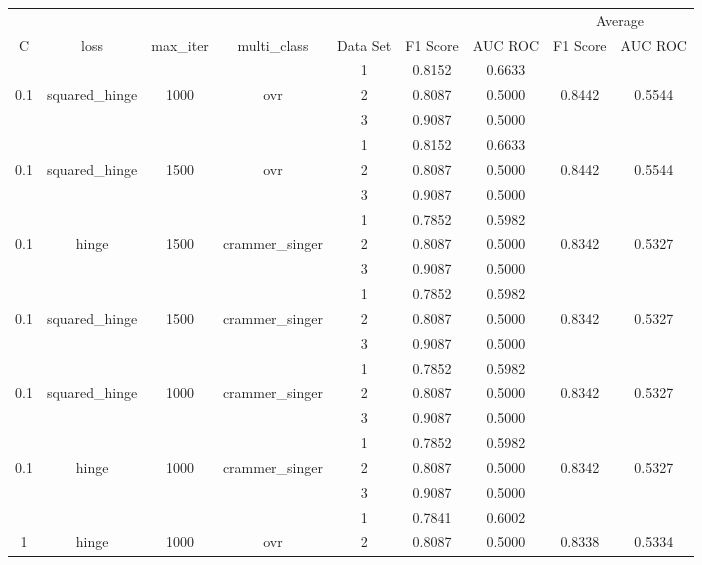 \documentclass[12pt, twoside]{article}
\begin{document}
\begin{landscape}
\begin{table}[!htbp]
  \centering
  \begin{tabular}{ccccccccc}
  \toprule
  {}	&	{}	&	{}	&	{}	&	{}	&	{}	&	{}	&	\multicolumn{2}{c}{Average} \\
  \cmidrule(r){8-9}
  C	&	loss	&	max\_iter	&	multi\_class	&	Data Set	&	F1 Score	&	AUC ROC	&	F1 Score	&	AUC ROC \\
  \midrule
  	&	&	&	&	1	&	0.8152	&	0.6633	&		&	 \\
  0.1	&	squared\_hinge	&	1000	&	ovr	&	2	&	0.8087	&	0.5000	&	0.8442	&	0.5544 \\
  	&	&	&	&	3	&	0.9087	&	0.5000	&		&	 \\
  	\cmidrule(r){5-9}
  	&	&	&	&	1	&	0.8152	&	0.6633	&		&	 \\
  0.1	&	squared\_hinge	&	1500	&	ovr	&	2	&	0.8087	&	0.5000	&	0.8442	&	0.5544 \\
  	&	&	&	&	3	&	0.9087	&	0.5000	&		&	 \\
  	\cmidrule(r){5-9}
  	&	&	&	&	1	&	0.7852	&	0.5982	&		&	 \\
  0.1	&	hinge	&	1500	&	crammer\_singer	&	2	&	0.8087	&	0.5000	&	0.8342	&	0.5327 \\
  	&	&	&	&	3	&	0.9087	&	0.5000	&		&	 \\
  	\cmidrule(r){5-9}
  	&	&	&	&	1	&	0.7852	&	0.5982	&		&	 \\
  0.1	&	squared\_hinge	&	1500	&	crammer\_singer	&	2	&	0.8087	&	0.5000	&	0.8342	&	0.5327 \\
  	&	&	&	&	3	&	0.9087	&	0.5000	&		&	 \\
  	\cmidrule(r){5-9}
  	&	&	&	&	1	&	0.7852	&	0.5982	&		&	 \\
  0.1	&	squared\_hinge	&	1000	&	crammer\_singer	&	2	&	0.8087	&	0.5000	&	0.8342	&	0.5327 \\
  	&	&	&	&	3	&	0.9087	&	0.5000	&		&	 \\
  	\cmidrule(r){5-9}
  	&	&	&	&	1	&	0.7852	&	0.5982	&		&	 \\
  0.1	&	hinge	&	1000	&	crammer\_singer	&	2	&	0.8087	&	0.5000	&	0.8342	&	0.5327 \\
  	&	&	&	&	3	&	0.9087	&	0.5000	&		&	 \\
  	\cmidrule(r){5-9}
  	&	&	&	&	1	&	0.7841	&	0.6002	&		&	 \\
  1	&	hinge	&	1000	&	ovr	&	2	&	0.8087	&	0.5000	&	0.8338	&	0.5334 \\

\end{tabular}
\end{table}
\end{landscape}
\end{document}
